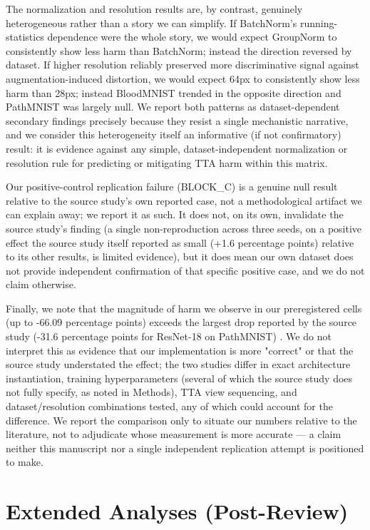 The normalization and resolution results are, by contrast, genuinely heterogeneous rather than a story we can simplify. If BatchNorm's running-statistics dependence were the whole story, we would expect GroupNorm to consistently show less harm than BatchNorm; instead the direction reversed by dataset. If higher resolution reliably preserved more discriminative signal against augmentation-induced distortion, we would expect 64px to consistently show less harm than 28px; instead BloodMNIST trended in the opposite direction and PathMNIST was largely null. We report both patterns as dataset-dependent secondary findings precisely because they resist a single mechanistic narrative, and we consider this heterogeneity itself an informative (if not confirmatory) result: it is evidence against any simple, dataset-independent normalization or resolution rule for predicting or mitigating TTA harm within this matrix.

Our positive-control replication failure (BLOCK\_C) is a genuine null result relative to the source study's own reported case, not a methodological artifact we can explain away; we report it as such. It does not, on its own, invalidate the source study's finding (a single non-reproduction across three seeds, on a positive effect the source study itself reported as small (+1.6 percentage points) relative to its other results, is limited evidence), but it does mean our own dataset does not provide independent confirmation of that specific positive case, and we do not claim otherwise.

Finally, we note that the magnitude of harm we observe in our preregistered cells (up to -66.09 percentage points) exceeds the largest drop reported by the source study (-31.6 percentage points for ResNet-18 on PathMNIST) \citep{medeiros2026tta}. We do not interpret this as evidence that our implementation is more "correct" or that the source study understated the effect; the two studies differ in exact architecture instantiation, training hyperparameters (several of which the source study does not fully specify, as noted in Methods), TTA view sequencing, and dataset/resolution combinations tested, any of which could account for the difference. We report the comparison only to situate our numbers relative to the literature, not to adjudicate whose measurement is more accurate --- a claim neither this manuscript nor a single independent replication attempt is positioned to make.

\section{Extended Analyses (Post-Review)}


